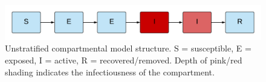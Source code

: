\begin{figure}[ht]
    \includegraphics[width=\textwidth]{../tex_descriptions/models/sm_sir/sm_sir_seir.pdf}
    \caption[Unstratified compartmental model structure.]{Unstratified compartmental model structure. \small S = susceptible, E = exposed, I = active, R = recovered/removed. Depth of pink/red shading indicates the infectiousness of the compartment.}
    \label{fig:seeiir}
\end{figure}
